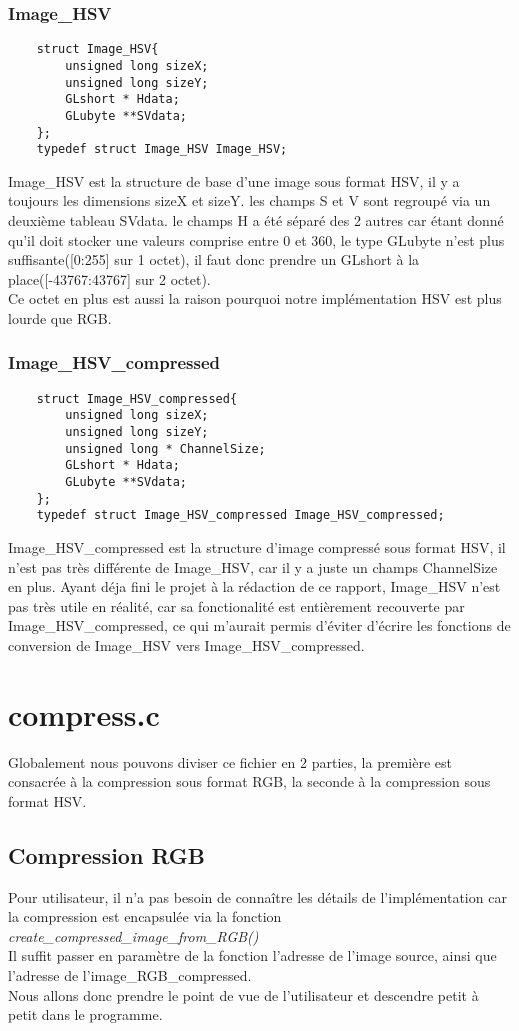 \documentclass[12pt, letterpaper]{article}
\begin{document}
\subsubsection{Image\_HSV}
\begin{verbatim}
    struct Image_HSV{
        unsigned long sizeX;
        unsigned long sizeY;
        GLshort * Hdata;
        GLubyte **SVdata;
    };
    typedef struct Image_HSV Image_HSV;
\end{verbatim}
Image\_HSV est la structure de base d'une image sous format HSV, il y a toujours les dimensions sizeX et sizeY. 
les champs S et V sont regroupé via un deuxième tableau SVdata. le champs H a été séparé des 2 autres car étant donné qu'il doit stocker une valeurs comprise entre 0 et 360,
le type GLubyte n'est plus suffisante([0:255] sur 1 octet), il faut donc prendre un GLshort à la place([-43767:43767] sur 2 octet).\\
Ce octet en plus est aussi la raison pourquoi notre implémentation HSV est plus lourde que RGB.

\subsubsection{Image\_HSV\_compressed}
\begin{verbatim}
    struct Image_HSV_compressed{
        unsigned long sizeX;
        unsigned long sizeY;
        unsigned long * ChannelSize;
        GLshort * Hdata;
        GLubyte **SVdata;
    };
    typedef struct Image_HSV_compressed Image_HSV_compressed;
\end{verbatim}
Image\_HSV\_compressed est la structure d'image compressé sous format HSV, il n'est pas très différente de Image\_HSV, car il y a 
juste un champs ChannelSize en plus. Ayant déja fini le projet à la rédaction de ce rapport, Image\_HSV n'est pas très utile en réalité, 
car sa fonctionalité est entièrement recouverte par Image\_HSV\_compressed, ce qui m'aurait 
permis d'éviter d'écrire les fonctions de conversion de Image\_HSV vers Image\_HSV\_compressed.

\section{compress.c}
Globalement nous pouvons diviser ce fichier en 2 parties, la première est consacrée à la compression sous format RGB, 
la seconde à la compression sous format HSV.
\subsection{Compression RGB}
Pour utilisateur, il n'a pas besoin de connaître les détails de l'implémentation car la compression est encapsulée via la fonction \\
\textit{create\_compressed\_image\_from\_RGB()}\\
Il suffit passer en paramètre de la fonction l'adresse de l'image source, ainsi que l'adresse de l'image\_RGB\_compressed.\\
Nous allons donc prendre le point de vue de l'utilisateur et descendre petit à petit dans le programme.
\end{document}
